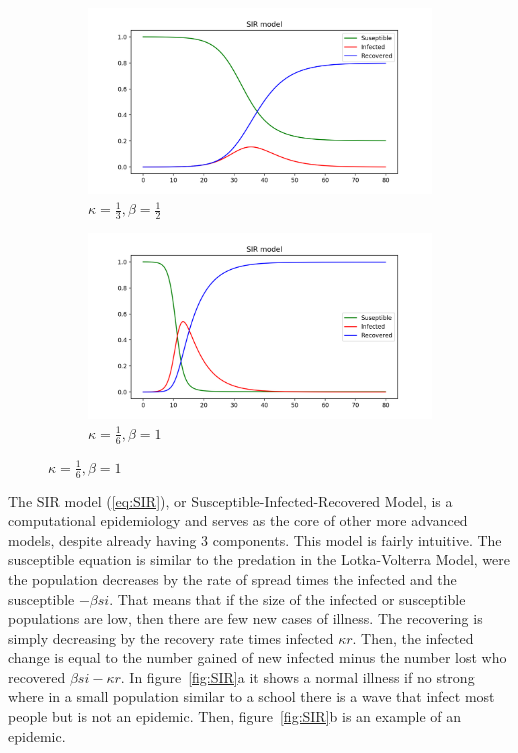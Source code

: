 \documentclass[12pt, letterpaper]{article}
\begin{document}
\begin{figure}[!h]
  \caption{Examples of SIR model}
  \label{fig:SIR}
  \begin{center}
    \begin{subfigure}[b]{.35\linewidth}
      \includegraphics[width=\linewidth]{SIR/SIR_Start}
      \caption{$\kappa = \frac{1}{3}, \beta = \frac{1}{2}$}
    \end{subfigure}
    \begin{subfigure}[b]{.35\linewidth}
      \includegraphics[width=\linewidth]{SIR/SIR_Epi}
      \caption{$\kappa = \frac{1}{6}, \beta =  1$}
    \end{subfigure}
  \end{center}
\end{figure}

The SIR model (\ref{eq:SIR}), or Susceptible-Infected-Recovered Model, is a computational epidemiology and
serves as the core of other more advanced models, despite already having 3 components. This model is
fairly intuitive. The susceptible equation is similar to the predation in the Lotka-Volterra Model, were the
population decreases by the rate of spread times the infected and the susceptible $- \beta s i$. That means
that if the size of the infected or susceptible populations are low, then there are few new cases of 
illness. The recovering is simply decreasing by the recovery rate times infected $\kappa r$.  Then, the
infected change is equal to the number gained of new infected minus the number lost who recovered $\beta s
i - \kappa r$. In figure~\ref{fig:SIR}a it shows a normal illness if no strong where in a small population
similar to a school there is a wave that infect most people but is not an epidemic. Then, 
figure~\ref{fig:SIR}b is an example of an epidemic.
\end{document}
